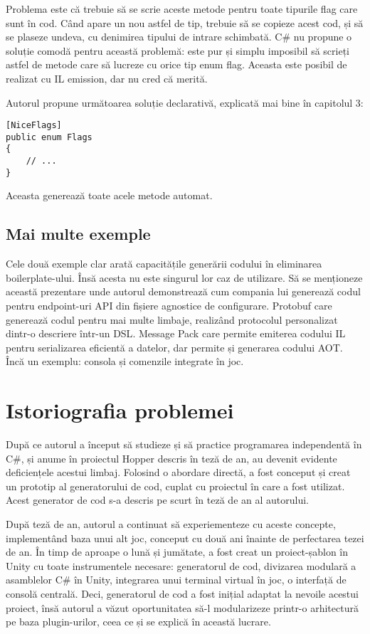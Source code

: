 \documentclass[a4paper,12pt]{report}
\begin{document}
Problema este că trebuie să se scrie aceste metode pentru toate tipurile flag care sunt în cod.
Când apare un nou astfel de tip, trebuie să se copieze acest cod, și să se plaseze undeva, cu denimirea tipului de intrare schimbată.
C\# nu propune o soluție comodă pentru această problemă: este pur și simplu imposibil să scrieți astfel de metode care să lucreze cu orice tip enum flag.
Aceasta este posibil de realizat cu IL emission, dar nu cred că merită.

Autorul propune următoarea soluție declarativă, explicată mai bine în capitolul 3:

\begin{verbatim}
[NiceFlags]
public enum Flags
{
    // ...
}
\end{verbatim}

Aceasta generează toate acele metode automat.

\subsection{Mai multe exemple}

Cele două exemple clar arată capacitățile generării codului în eliminarea boilerplate-ului.
Însă acesta nu este singurul lor caz de utilizare.
Să se menționeze această prezentare\cite{microservices_code_generation} unde autorul demonstrează cum compania lui generează codul pentru endpoint-uri \ac{API} din fișiere agnostice de configurare.
Protobuf\cite{protobuf} care generează codul pentru mai multe limbaje, realizând protocolul personalizat dintr-o descriere într-un \ac{DSL}.
Message Pack\cite{message_pack_github} care permite emiterea codului IL pentru serializarea eficientă a datelor, dar permite și generarea codului \ac{AOT}.
Încă un exemplu: consola și comenzile integrate în joc\cite{command_terminal}.


\section{Istoriografia problemei}

După ce autorul a început să studieze și să practice programarea independentă în C\#, și anume în proiectul Hopper descris în teză de an, au devenit evidente deficiențele acestui limbaj.
Folosind o abordare directă, a fost conceput și creat un prototip al generatorului de cod, cuplat cu proiectul în care a fost utilizat.
Acest generator de cod s-a descris pe scurt în teză de an al autorului.

După teză de an, autorul a continuat să experiementeze cu aceste concepte, implementând baza unui alt joc, conceput cu două ani înainte de perfectarea tezei de an.
În timp de aproape o lună și jumătate, a fost creat un proiect-șablon în Unity cu toate instrumentele necesare: generatorul de cod, divizarea modulară a asamblelor C\# în Unity, integrarea unui terminal virtual în joc, o interfață de consolă centrală\cite{particular_project}.
Deci, generatorul de cod a fost inițial adaptat la nevoile acestui proiect, însă autorul a văzut oportunitatea să-l modularizeze printr-o arhitectură pe baza plugin-urilor, ceea ce și se explică în această lucrare.
\end{document}
